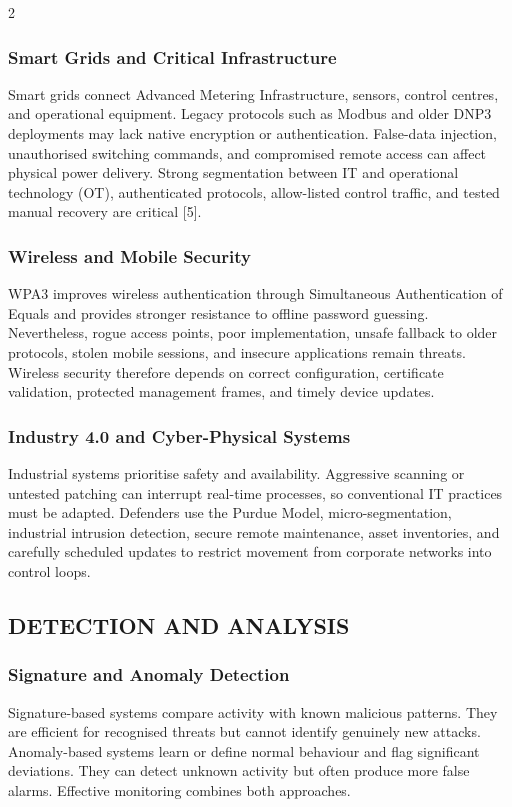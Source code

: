 \begin{multicols}{2}
  \subsubsection*{Smart Grids and Critical Infrastructure}
  Smart grids connect Advanced Metering Infrastructure, sensors, control centres, and operational equipment. Legacy protocols such as Modbus and older DNP3 deployments may lack native encryption or authentication. False-data injection, unauthorised switching commands, and compromised remote access can affect physical power delivery. Strong segmentation between IT and operational technology (OT), authenticated protocols, allow-listed control traffic, and tested manual recovery are critical [5].

  \subsubsection*{Wireless and Mobile Security}
  {\justifying WPA3 improves wireless authentication through Simultaneous Authentication of Equals and provides stronger resistance to offline password guessing. Nevertheless, rogue access points, poor implementation, unsafe fallback to older protocols, stolen mobile sessions, and insecure applications remain threats. Wireless security therefore depends on correct configuration, certificate validation, protected management frames, and timely device updates.\par}

  \subsubsection*{Industry 4.0 and Cyber-Physical Systems}
  Industrial systems prioritise safety and availability. Aggressive scanning or untested patching can interrupt real-time processes, so conventional IT practices must be adapted. Defenders use the Purdue Model, micro-segmentation, industrial intrusion detection, secure remote maintenance, asset inventories, and carefully scheduled updates to restrict movement from corporate networks into control loops.

  \subsection*{\centering\uppercase{Detection and Analysis}}
  \subsubsection*{Signature and Anomaly Detection}
  Signature-based systems compare activity with known malicious patterns. They are efficient for recognised threats but cannot identify genuinely new attacks. Anomaly-based systems learn or define normal behaviour and flag significant deviations. They can detect unknown activity but often produce more false alarms. Effective monitoring combines both approaches.


\end{multicols}

